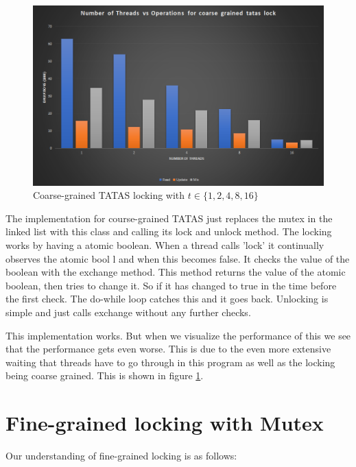 \begin{figure}
    \centering
    \includegraphics[width=\linewidth]{Figures/coarsegrainedtatas.png}
    \caption{Coarse-grained TATAS locking with $t \in \{1, 2, 4, 8, 16\}$}
    \label{fig:coarsegrainedtatas}
\end{figure}


The implementation for course-grained TATAS just replaces the mutex in the
linked list with this class and calling its lock and unlock method.
The locking works by having a atomic boolean. When a thread calls 'lock'
it continually observes the atomic bool l and when this becomes false. It checks
the value of the boolean with the exchange method. This method returns the value
of the atomic boolean, then tries to change it. So if it has changed to true
in the time before the first check. The do-while loop catches this and it goes 
back. Unlocking is simple and just calls exchange without any further checks.

This implementation works. But when we visualize the performance of this we see
that the performance gets even worse. This is due to the even more extensive 
waiting that threads have to go through in this program as well as the locking
being coarse grained. This is shown in figure \ref{fig:coarsegrainedtatas}.

\section{Fine-grained locking with Mutex}\label{sec:finegrainedmutex}

Our understanding of fine-grained locking is as follows:

